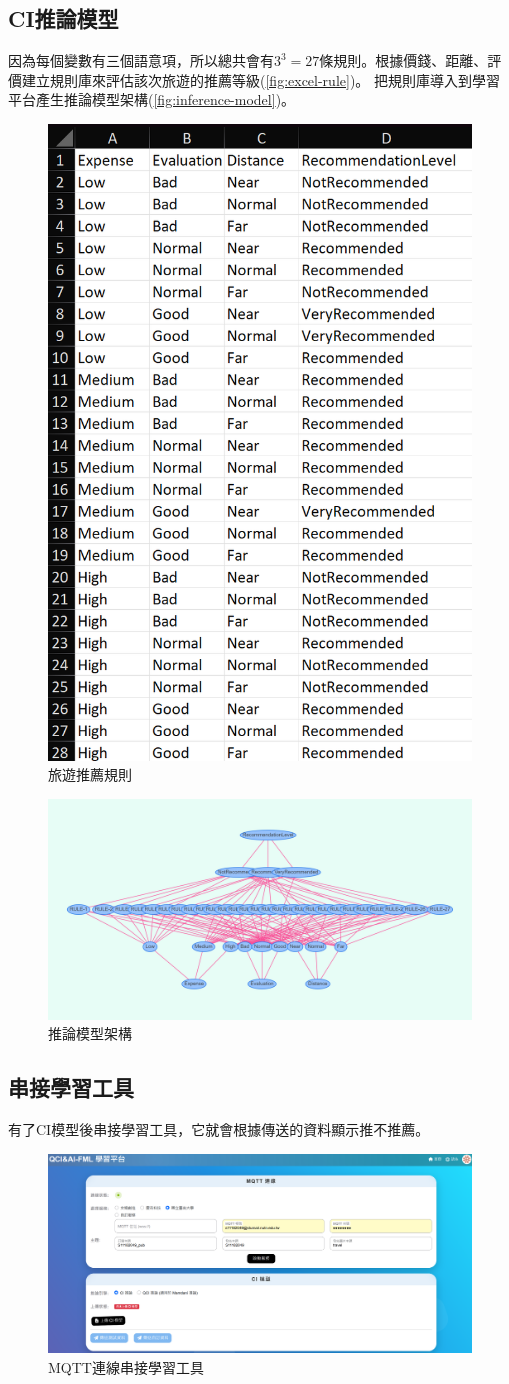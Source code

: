 \subsection{CI推論模型}
因為每個變數有三個語意項，所以總共會有$3^3=27$條規則。根據價錢、距離、評價建立規則庫來評估該次旅遊的推薦等級(\autoref{fig:excel-rule})。
把規則庫導入到學習平台產生推論模型架構(\autoref{fig:inference-model})。
\begin{figure}[htbp!]
    \centering
    \includegraphics[width=0.45\linewidth]{images/w4/excel-rule.png}
    \caption{旅遊推薦規則}
    \label{fig:excel-rule}
\end{figure}

\begin{figure}[htbp!]
    \centering
    \includegraphics[width=0.8\linewidth]{images/w4/CI-rule.png}
    \caption{推論模型架構}
    \label{fig:inference-model}
\end{figure}

\subsection{串接學習工具}
有了CI模型後串接學習工具，它就會根據傳送的資料顯示推不推薦。
\begin{figure}[htbp!]
    \centering
    \includegraphics[width=0.7\linewidth]{images/w6/MQTT.png}
    \caption{MQTT連線串接學習工具}
    \label{fig:MQTT}
\end{figure}

